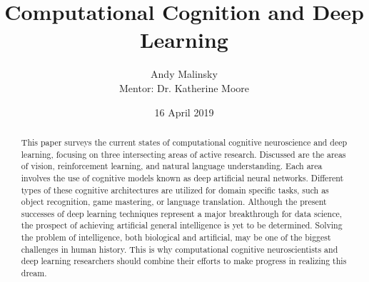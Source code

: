 \documentclass[12pt]{article}
\title{Computational Cognition and Deep Learning}
\author{Andy Malinsky \\
Mentor: Dr. Katherine Moore}
\date{16 April 2019}
\begin{document}
\maketitle
\doublespacing
\begin{abstract}
    This paper surveys the current states of computational cognitive neuroscience and deep learning, focusing on three intersecting areas of active research. Discussed are the areas of vision, reinforcement learning, and natural language understanding. Each area involves the use of cognitive models known as deep artificial neural networks. Different types of these cognitive architectures are utilized for domain specific tasks, such as object recognition, game mastering, or language translation. Although the present successes of deep learning techniques represent a major breakthrough for data science, the prospect of achieving artificial general intelligence is yet to be determined. Solving the problem of intelligence, both biological and artificial, may be one of the biggest challenges in human history. This is why computational cognitive neuroscientists and deep learning researchers should combine their efforts to make progress in realizing this dream. 
\end{abstract}
\newpage
\tableofcontents
\newpage
\end{document}
